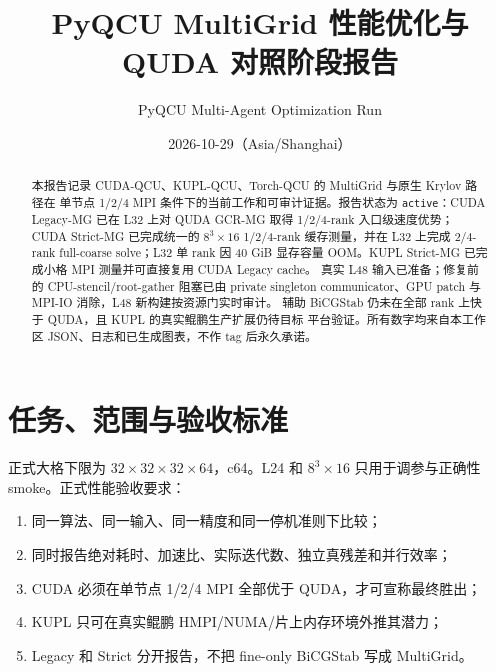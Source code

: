 \documentclass[UTF8,11pt,a4paper]{ctexart}
\title{PyQCU MultiGrid 性能优化与 QUDA 对照阶段报告}
\author{PyQCU Multi-Agent Optimization Run}
\date{2026-10-29（Asia/Shanghai）}
\newcommand{\code}[1]{\texttt{\expandafter\seqsplit\expandafter{\detokenize{#1}}}}
\begin{document}
\maketitle

\begin{abstract}
本报告记录 CUDA-QCU、KUPL-QCU、Torch-QCU 的 MultiGrid 与原生 Krylov 路径在
单节点 1/2/4 MPI 条件下的当前工作和可审计证据。报告状态为
\texttt{active}：CUDA Legacy-MG 已在 L32 上对 QUDA GCR-MG 取得 1/2/4-rank
入口级速度优势；CUDA Strict-MG 已完成统一的 \(8^3\times16\) 1/2/4-rank
缓存测量，并在 L32 上完成 2/4-rank full-coarse solve；L32 单 rank 因 40 GiB
显存容量 OOM。KUPL Strict-MG 已完成小格 MPI 测量并可直接复用 CUDA Legacy cache。
真实 L48 输入已准备；修复前的 CPU-stencil/root-gather 阻塞已由 private singleton
communicator、GPU patch 与 \code{lonv} MPI-IO 消除，L48 新构建按资源门实时审计。
辅助 BiCGStab 仍未在全部 rank 上快于 QUDA，且 KUPL 的真实鲲鹏生产扩展仍待目标
平台验证。所有数字均来自本工作区 JSON、日志和已生成图表，不作 tag 后永久承诺。
\end{abstract}

\section{任务、范围与验收标准}

正式大格下限为 \(32\times32\times32\times64\)，c64。L24 和 \(8^3\times16\)
只用于调参与正确性 smoke。正式性能验收要求：
\begin{enumerate}[leftmargin=1.5em]
  \item 同一算法、同一输入、同一精度和同一停机准则下比较；
  \item 同时报告绝对耗时、加速比、实际迭代数、独立真残差和并行效率；
  \item CUDA 必须在单节点 1/2/4 MPI 全部优于 QUDA，才可宣称最终胜出；
  \item KUPL 只可在真实鲲鹏 HMPI/NUMA/片上内存环境外推其潜力；
  \item Legacy 和 Strict 分开报告，不把 fine-only BiCGStab 写成 MultiGrid。
\end{enumerate}
\end{document}
